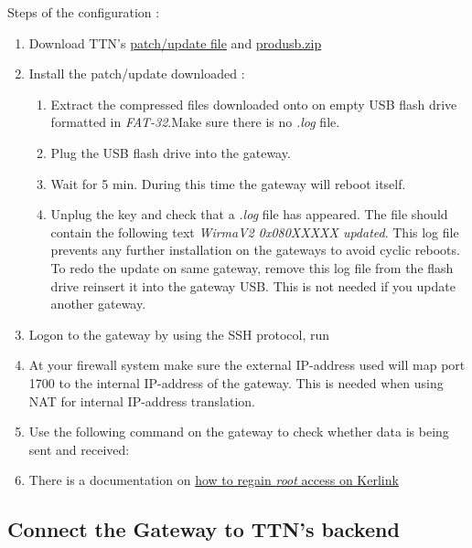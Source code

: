 \documentclass[a4paper]{article}
\begin{document}
Steps of the configuration :
\begin{enumerate}
 \item Download TTN's 
 \href{https://github.com/TheThingsNetwork/kerlink-station-firmware/raw/master/dota/dota_thethingsnetwork_v1.3_EU.tar.gz}{patch/update file}
 and \href{https://github.com/TheThingsNetwork/kerlink-station-firmware/raw/master/dota/produsb.zip}{produsb.zip}
 \item Install the patch/update downloaded :
 \begin{enumerate}
  \item Extract the compressed files downloaded onto on empty USB flash drive formatted in \textit{FAT-32}.Make sure there is no \textit{.log} file.
  \item Plug the USB flash drive into the gateway.
  \item Wait for 5 min. During this time the gateway will reboot itself.
  \item Unplug the key and check that a \textit{.log} file has appeared. The file should contain the following text \textit{WirmaV2 0x080XXXXX updated}. This log file prevents any further installation on the gateways to avoid cyclic reboots.
To redo the update on same gateway, remove this log file from the flash drive reinsert it into the gateway USB. This is not needed if you update another gateway.
 \end{enumerate}
 \item Logon to the gateway by using the SSH protocol, run 
 \newline {}\par
 \item At your firewall system make sure the external IP-address used will map port 1700 to the internal IP-address of the gateway. This is needed when using NAT for internal IP-address translation.
 \item Use the following command on the gateway to check whether data is being sent and received: 
 \newline {}\par
 \item There is a documentation on \href{https://github.com/swiatecki/IoTPublic/blob/master/howto.md}{how to regain \textit{root} access on Kerlink}
\end{enumerate}

\subsection{Connect the Gateway to TTN's backend}
\end{document}
